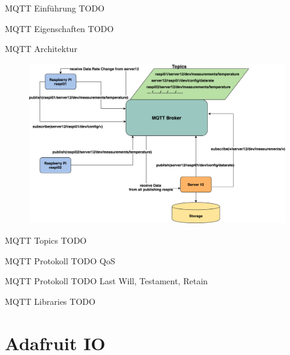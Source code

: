 \begin{frame}{MQTT Einführung}
    TODO
\end{frame}

\begin{frame}{MQTT Eigenschaften}
    TODO
\end{frame}


\begin{frame}{MQTT Architektur}
      \begin{figure}[!htb]
  \hspace*{5mm}
        \includegraphics[scale=0.15]{7-datenaustausch/img/mqttarch} 
    \end{figure}
\end{frame}


\begin{frame}{MQTT Topics}
    TODO
\end{frame}

\begin{frame}{MQTT Protokoll}
    TODO 
    QoS
\end{frame}

\begin{frame}{MQTT Protokoll}
    TODO 
   Last Will, Testament, Retain
\end{frame}


\begin{frame}{MQTT Libraries}
    TODO
\end{frame}


\section{Adafruit IO}

